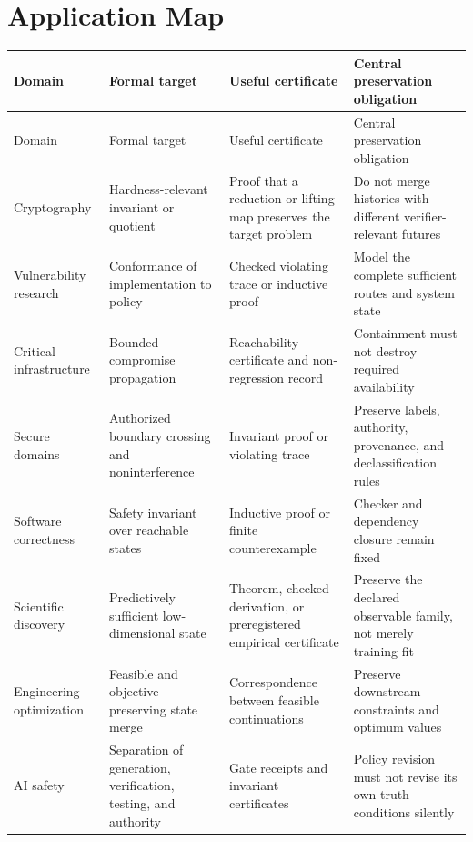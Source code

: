 \documentclass[11pt,oneside]{book}
\theoremstyle{definition}
\theoremstyle{remark}
\begin{document}
\chapter{Application Map}

\begin{longtable}{>{\raggedright\arraybackslash}p{}>{\raggedright\arraybackslash}p{}>{\raggedright\arraybackslash}p{}>{\raggedright\arraybackslash}p{}}
\toprule
Domain & Formal target & Useful certificate & Central preservation obligation \\
\midrule
\endfirsthead
\toprule
Domain & Formal target & Useful certificate & Central preservation obligation \\
\midrule
\endhead
Cryptography & Hardness-relevant invariant or quotient & Proof that a reduction or lifting map preserves the target problem & Do not merge histories with different verifier-relevant futures \\
Vulnerability research & Conformance of implementation to policy & Checked violating trace or inductive proof & Model the complete sufficient routes and system state \\
Critical infrastructure & Bounded compromise propagation & Reachability certificate and non-regression record & Containment must not destroy required availability \\
Secure domains & Authorized boundary crossing and noninterference & Invariant proof or violating trace & Preserve labels, authority, provenance, and declassification rules \\
Software correctness & Safety invariant over reachable states & Inductive proof or finite counterexample & Checker and dependency closure remain fixed \\
Scientific discovery & Predictively sufficient low-dimensional state & Theorem, checked derivation, or preregistered empirical certificate & Preserve the declared observable family, not merely training fit \\
Engineering optimization & Feasible and objective-preserving state merge & Correspondence between feasible continuations & Preserve downstream constraints and optimum values \\
AI safety & Separation of generation, verification, testing, and authority & Gate receipts and invariant certificates & Policy revision must not revise its own truth conditions silently \\
\bottomrule
\end{longtable}
\end{document}
